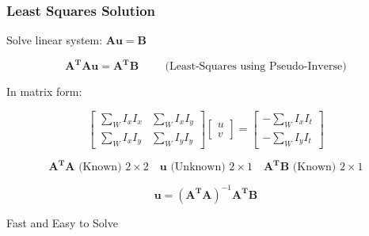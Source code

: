 \begin{frame}
  \frametitle{Least Squares Solution}

  Solve linear system: \quad $\mathbf{A u = B}$

  \[
  \mathbf{A^T A u = A^T B} \hspace{1cm} \text{(Least-Squares using Pseudo-Inverse)}
  \]

  In matrix form:

  \[
  \boxed{
  \begin{bmatrix}
  \sum_W I_x I_x & \sum_W I_x I_y \\
  \sum_W I_x I_y & \sum_W I_y I_y
  \end{bmatrix}
  }
  \begin{bmatrix}
  u \\ v
  \end{bmatrix}
  =
  \boxed{
  \begin{bmatrix}
  -\sum_W I_x I_t \\ -\sum_W I_y I_t
  \end{bmatrix}
  }
  \]

  \[
  \mathbf{A^T A} \text{ (Known) } 2\times2 \quad 
  \mathbf{u} \text{ (Unknown) } 2\times1 \quad 
  \mathbf{A^T B} \text{ (Known) } 2\times1
  \]

  \[
  \boxed{\mathbf{u} = (\mathbf{A^T A})^{-1}\mathbf{A^T B}}
  \]

  Fast and Easy to Solve

\end{frame}

